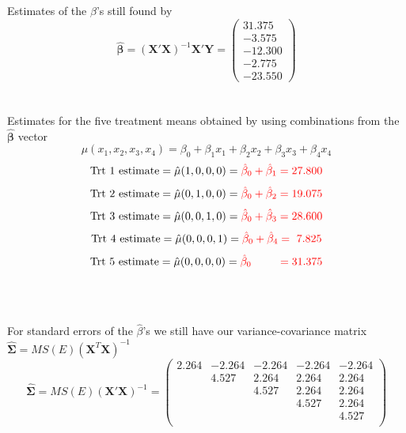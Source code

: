 \newpage

Estimates of the $\beta$'s still found by 
\[\hat{\boldsymbol{\beta}}= (\textbf{X}'\textbf{X})^{-1}\textbf{X}'\textbf{Y} = \left(\begin{array}{r} 31.375 \\ -3.575 \\ -12.300 \\
-2.775 \\ -23.550 \end{array} \right)
\]
~\\~\\

Estimates for the five treatment means obtained by using combinations from the $\hat{\boldsymbol{\beta}}$ vector 
$$\mu(x_1,x_2,x_3,x_4)=\beta_0 + \beta_1 x_1 + \beta_2 x_2 + \beta_3 x_3 + \beta_4 x_4$$
$$\mbox{Trt 1 estimate} = \hat\mu(1,0,0,0) =%
\textcolor{red}{\hat\beta_0 + \hat\beta_1 =  27.800 }$$
$$\mbox{Trt 2 estimate} = \hat\mu(0,1,0,0) =%
\textcolor{red}{\hat\beta_0 + \hat\beta_2 =  19.075 }$$
$$\mbox{Trt 3 estimate} = \hat\mu(0,0,1,0) =%
\textcolor{red}{\hat\beta_0 + \hat\beta_3 =  28.600}$$
$$\mbox{Trt 4 estimate} = \hat\mu(0,0,0,1) =%
\textcolor{red}{\hat\beta_0 + \hat\beta_4 =  ~7.825}$$
$$\mbox{Trt 5 estimate} = \hat\mu(0,0,0,0) =%
\textcolor{red}{\hat\beta_0~~~~~~~ =  31.375}$$
~\\~\\~\\

For standard errors of the $\hat{\beta}$'s we still have our variance-covariance matrix $\hat{\boldsymbol{\Sigma}}=MS(E)(\textbf{X}^{T}\textbf{X})^{-1}$
\[ 
\hat{\boldsymbol{\Sigma}} = MS(E) (\textbf{X}'\textbf{X})^{-1} = \left(\begin{array}{rrrrr} 
2.264   & -2.264      & -2.264      & -2.264      & -2.264 \\
      & 4.527       & 2.264      & 2.264       & 2.264 \\
      &           & 4.527       & 2.264       & 2.264 \\
      &           &           & 4.527      & 2.264 \\
      &           &           &           & 4.527 \\
\end{array} \right)
\]

